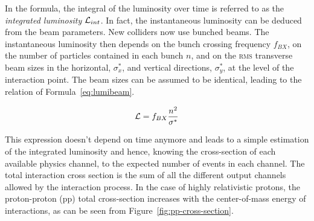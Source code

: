 	In the formula, the integral of the luminosity over time is referred to as the \textit{integrated luminosity} $\mathcal{L}_{int}$. In fact, the instantaneous luminosity can be deduced from the beam parameters. New colliders now use bunched beams. The instantaneous luminosity then depends on the bunch crossing frequency $f_{BX}$, on the number of particles contained in each bunch $n$, and on the \textsc{rms} transverse beam sizes in the horizontal, $\sigma^*_x$, and vertical directions, $\sigma^*_y$, at the level of the interaction point. The beam sizes  can be assumed to be identical, leading to the relation of Formula~\ref{eq:lumibeam}.
	
	\begin{equation}
		\label{eq:lumibeam}
		\mathcal{L} = f_{BX}\frac{n^2}{\sigma^*}
	\end{equation}
	
	This expression doesn't depend on time anymore and leads to a simple estimation of the integrated luminosity and hence, knowing the cross-section of each available physics channel, to the expected number of events in each channel. The total interaction cross section is the sum of all the different output channels allowed by the interaction process. In the case of highly relativistic protons, the proton-proton (pp) total cross-section increases with the center-of-mass energy of interactions, as can be seen from Figure~\ref{fig:pp-cross-section}.
	
